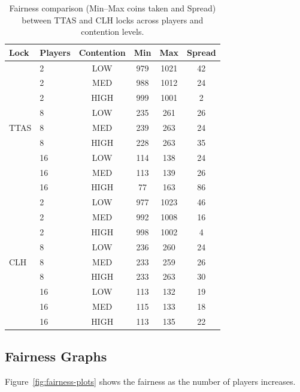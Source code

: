 \documentclass[12pt,a4paper]{article}
\begin{document}
\begin{table}[H]
\centering
\begin{tabular}{@{}llcccc@{}}
\toprule
Lock & Players & Contention & Min & Max & Spread \\ \midrule
\multirow{9}{*}{TTAS}
    & 2  & LOW    & 979  & 1021 & 42  \\
    & 2  & MED    & 988  & 1012 & 24  \\
    & 2  & HIGH   & 999  & 1001 & 2   \\
    & 8  & LOW    & 235  & 261  & 26  \\
    & 8  & MED    & 239  & 263  & 24  \\
    & 8  & HIGH   & 228  & 263  & 35  \\
    & 16 & LOW    & 114  & 138  & 24  \\
    & 16 & MED    & 113  & 139  & 26  \\
    & 16 & HIGH   & 77   & 163  & 86  \\ \midrule
\multirow{9}{*}{CLH}
    & 2  & LOW    & 977  & 1023 & 46  \\
    & 2  & MED    & 992  & 1008 & 16  \\
    & 2  & HIGH   & 998  & 1002 & 4   \\
    & 8  & LOW    & 236  & 260  & 24  \\
    & 8  & MED    & 233  & 259  & 26  \\
    & 8  & HIGH   & 233  & 263  & 30  \\
    & 16 & LOW    & 113  & 132  & 19  \\
    & 16 & MED    & 115  & 133  & 18  \\
    & 16 & HIGH   & 113  & 135  & 22  \\ 
\bottomrule
\end{tabular}

\caption{Fairness comparison (Min--Max coins taken and Spread) between TTAS and CLH locks across players and contention levels.}
\label{tab:fairness}
\end{table}

\clearpage
\subsection{Fairness Graphs}
Figure~\ref{fig:fairness-plots} shows the fairness as the number of players increases.
\end{document}

